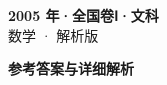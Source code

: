 \documentclass[zihao=-4, a4paper]{ctexart}
\begin{document}
\begin{center}
  {\Large\bfseries 2005 年·全国卷Ⅰ·文科}\\[4pt]
  {\large 数学 · 解析版}
\end{center}
\medskip
{}

\clearpage
{}
\begin{center}{\Large\bfseries 参考答案与详细解析}\end{center}
\medskip

\end{document}
